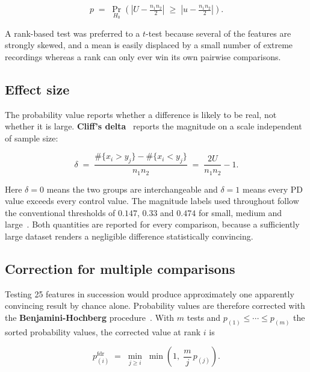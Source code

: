 \begin{equation}
  p \;=\; \Pr_{H_0}\!\left( \left| U - \tfrac{n_1 n_2}{2} \right| \;\ge\;
  \left| u - \tfrac{n_1 n_2}{2} \right| \right).
  \label{eq:pval}
\end{equation}

\noindent A rank-based
test was preferred to a $t$-test because several of the features are strongly
skewed, and a mean is easily displaced by a small number of extreme recordings
whereas a rank can only ever win its own pairwise comparisons.

\subsection{Effect size}

The probability value reports whether a difference is likely to be real, not
whether it is large. \textbf{Cliff's delta}~\cite{cliff1993} reports the
magnitude on a scale independent of sample size:

\begin{equation}
  \delta \;=\; \frac{\#\{x_i > y_j\} - \#\{x_i < y_j\}}{n_1 n_2}
        \;=\; \frac{2U}{n_1 n_2} - 1 .
  \label{eq:cliff}
\end{equation}

\noindent Here $\delta = 0$ means the two groups are interchangeable and
$\delta = 1$ means every PD value exceeds every control value. The magnitude
labels used throughout follow the conventional thresholds of
$0.147$, $0.33$ and $0.474$ for small, medium and large~\cite{romano2006}.
Both quantities are reported for every comparison, because a sufficiently large
dataset renders a negligible difference statistically convincing.

\subsection{Correction for multiple comparisons}

Testing 25 features in succession would produce approximately one apparently
convincing result by chance alone. Probability values are therefore corrected
with the \textbf{Benjamini-Hochberg} procedure~\cite{benjamini1995}. With $m$
tests and $p_{(1)} \le \cdots \le p_{(m)}$ the sorted probability values, the
corrected value at rank $i$ is

\begin{equation}
  p^{\mathrm{fdr}}_{(i)} \;=\; \min_{j \ge i}\;
  \min\!\left(1,\; \frac{m}{j}\, p_{(j)}\right).
  \label{eq:bh}
\end{equation}

